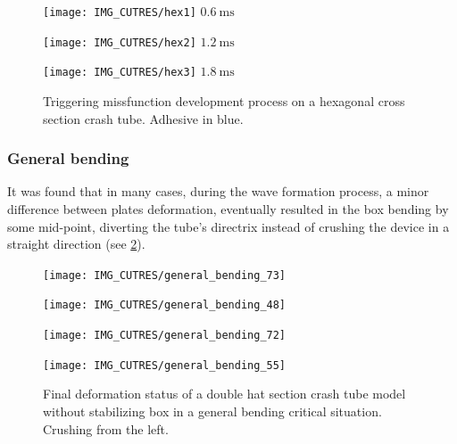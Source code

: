 \documentclass[cmfonts]{witpress}
\begin{document}
\begin{figure}
	\centering
	\begin{minipage}[b]{.3\linewidth}
		\centering
		\texttt{[image: IMG\_CUTRES/hex1]}
		$\SI{0.6}{\ms}$
	\end{minipage}
	\quad
	\begin{minipage}[b]{.3\linewidth}
		\centering
		\texttt{[image: IMG\_CUTRES/hex2]}
		$\SI{1.2}{\ms}$
	\end{minipage}
	\quad
	\begin{minipage}[b]{.3\linewidth}
		\centering
		\texttt{[image: IMG\_CUTRES/hex3]}
		$\SI{1.8}{\ms}$
	\end{minipage}
	\caption[Triggering missfunction development process on a hexagonal cross section crash tube.]{Triggering missfunction development process on a hexagonal cross section crash tube. Adhesive in blue.}
	\label{fig:hex_tmf}
\end{figure}

\subsubsection{General bending}

It was found that in many cases, during the wave formation process, a minor difference between plates deformation, eventually resulted in the box bending by some mid-point, diverting the tube's directrix instead of crushing the device in a straight direction (see \cref{fig:general_bending}).

\begin{figure}
	\centering
	\begin{minipage}[b]{.7\linewidth}
		\texttt{[image: IMG\_CUTRES/general\_bending\_73]}
	\end{minipage}
	\quad
	\begin{minipage}[b]{.3\linewidth}
		\texttt{[image: IMG\_CUTRES/general\_bending\_48]}
	\end{minipage}
	\quad
	\begin{minipage}[b]{.3\linewidth}
		\texttt{[image: IMG\_CUTRES/general\_bending\_72]}
	\end{minipage}
	\quad
	\begin{minipage}[b]{.3\linewidth}
		\texttt{[image: IMG\_CUTRES/general\_bending\_55]}
	\end{minipage}
\caption[Final deformation status of a double hat section crash tube model without stabilizing box in a general bending critical situation.]{Final deformation status of a double hat section crash tube model without stabilizing box in a general bending critical situation. Crushing from the left.}
\label{fig:general_bending}
\end{figure}
\end{document}
